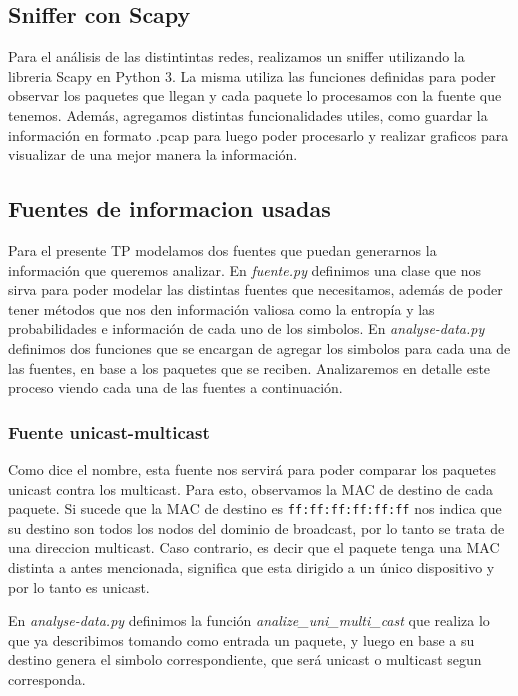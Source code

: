 \subsection{Sniffer con Scapy}

Para el an\'alisis de las distintintas redes, realizamos un sniffer utilizando la libreria Scapy en Python 3. La misma utiliza las funciones definidas para poder observar los paquetes que llegan y cada paquete lo procesamos con la fuente que tenemos. Adem\'as, agregamos distintas funcionalidades utiles, como guardar la informaci\'on en formato .pcap para luego poder procesarlo y realizar graficos para visualizar de una mejor manera la informaci\'on.

\subsection{Fuentes de informacion usadas}

Para el presente TP modelamos dos fuentes que puedan generarnos la informaci\'on que queremos analizar. En \textit{fuente.py} definimos una clase que nos sirva para poder modelar las distintas fuentes que necesitamos, adem\'as de poder tener m\'etodos que nos den informaci\'on valiosa como la entrop\'ia y las probabilidades e informaci\'on de cada uno de los simbolos. En \textit{analyse-data.py} definimos dos funciones que se encargan de agregar los simbolos para cada una de las fuentes, en base a los paquetes que se reciben. Analizaremos en detalle este proceso viendo cada una de las fuentes a continuaci\'on.

\subsubsection{Fuente unicast-multicast}

Como dice el nombre, esta fuente nos servir\'a para poder comparar los paquetes unicast contra los multicast. Para esto, observamos la MAC de destino de cada paquete. Si sucede que la MAC de destino es \texttt{ff:ff:ff:ff:ff:ff} nos indica que su destino son todos los nodos del dominio de broadcast, por lo tanto se trata de una direccion multicast. Caso contrario, es decir que el paquete tenga una MAC distinta a antes mencionada, significa que esta dirigido a un \'unico dispositivo y por lo tanto es unicast.

En \textit{analyse-data.py} definimos la funci\'on \textit{analize\_uni\_multi\_cast} que realiza lo que ya describimos tomando como entrada un paquete, y luego en base a su destino genera el simbolo correspondiente, que será unicast o multicast segun corresponda.


